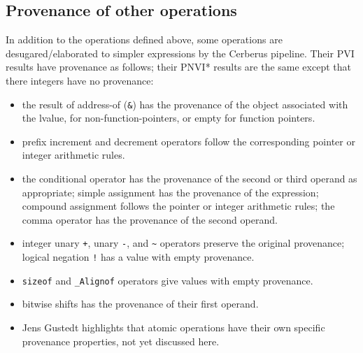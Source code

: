 \documentclass[acmsmall,review,screen]{acmart}\settopmatter{printfolios=true,printccs=false,printacmref=false}
\newenvironment{tightitemize}{

 \begin{itemize}
   \setlength{\itemsep}{0pt}
   \setlength{\parskip}{0pt}
   \setlength{\leftmargin}{0pt}
   \setlength{\leftmargini}{1.5mm}
   \setlength{\leftmarginii}{3mm}
   \setlength{\leftmarginiii}{4.5mm}
   \setlength{\labelwidth}{1.5mm}
   \setlength{\itemindent}{0mm}
   \setlength{\labelsep}{1.5mm}
   \setlength{\rightmargin}{0pt}
   \setlength{\topsep}{0pt}
   \setlength{\parsep}{0pt}}{\end{itemize}
 }
\begin{document}

\subsection{Provenance of other operations}
In addition to the operations defined above, 
some operations are desugared/elaborated to simpler
expressions by the Cerberus pipeline. 
Their PVI results have
provenance  as follows; their PNVI* results are the same except that
there integers have no provenance:
\begin{tightitemize}
  \item
    the result of address-of (\lstinline{&}) has the provenance of the
    object associated with the lvalue, for non-function-pointers, or
  empty for function pointers.
  \item
    prefix increment and decrement operators follow the corresponding pointer or
    integer arithmetic rules.
  \item
    the conditional operator has the provenance of the second or third
    operand as appropriate;
    simple assignment has the provenance of
    the expression; compound assignment follows the pointer or integer
    arithmetic rules; the comma operator has the provenance of
    the second operand.
  \item
    integer unary \lstinline{+}, unary \lstinline{-}, and
    \lstinline{~} operators preserve the original
    provenance; logical negation \lstinline{!} has a value with empty provenance.
  \item
    \lstinline{sizeof} and \lstinline{_Alignof} operators give values with
    empty provenance.
  \item
    bitwise shifts has the provenance of their first operand.

\item
Jens Gustedt highlights that atomic operations have their own specific provenance
properties, not yet discussed here.



\end{tightitemize}
\end{document}
